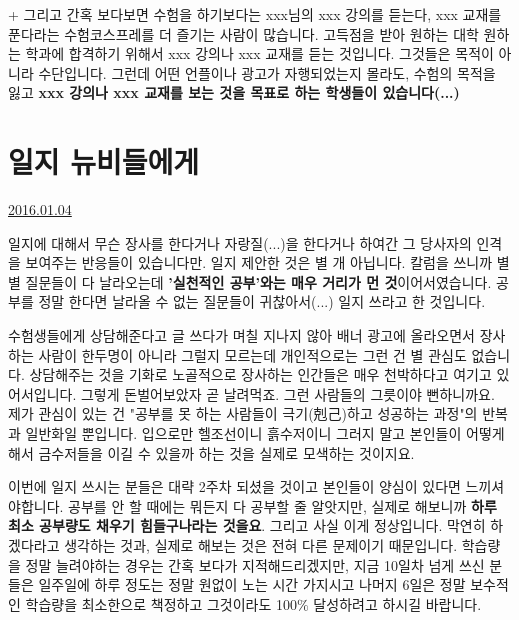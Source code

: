 + 그리고 간혹 보다보면 수험을 하기보다는 xxx님의 xxx 강의를 듣는다, xxx 교재를 푼다라는 수험코스프레를 더 즐기는 사람이 많습니다.
고득점을 받아 원하는 대학 원하는 학과에 합격하기 위해서 xxx 강의나 xxx 교재를 듣는 것입니다. 그것들은 목적이 아니라 수단입니다.
그런데 어떤 언플이나 광고가 자행되었는지 몰라도, 수험의 목적을 잃고 \textbf{xxx 강의나 xxx 교재를 보는 것을 목표로 하는 학생들이 있습니다(...)}
\vspace{5mm}






\section{일지 뉴비들에게}
\href{https://www.kockoc.com/Apoc/575186}{2016.01.04}

\vspace{5mm}

일지에 대해서 무슨 장사를 한다거나 자랑질(...)을 한다거나 하여간 그 당사자의 인격을 보여주는 반응들이 있습니다만.
일지 제안한 것은 별 개 아닙니다.
칼럼을 쓰니까 별별 질문들이 다 날라오는데 \textbf{'실천적인 공부'와는 매우 거리가 먼 것}이어서였습니다.
공부를 정말 한다면 날라올 수 없는 질문들이 귀찮아서(...) 일지 쓰라고 한 것입니다.
\vspace{5mm}

수험생들에게 상담해준다고 글 쓰다가 며칠 지나지 않아
배너 광고에 올라오면서 장사하는 사람이 한두명이 아니라 그럴지 모르는데
개인적으로는 그런 건 별 관심도 없습니다.
상담해주는 것을 기화로 노골적으로 장사하는 인간들은 매우 천박하다고 여기고 있어서입니다.
그렇게 돈벌어보았자 곧 날려먹죠. 그런 사람들의 그릇이야 뻔하니까요.
제가 관심이 있는 건 "공부를 못 하는 사람들이 극기(剋己)하고 성공하는 과정"의 반복과 일반화일 뿐입니다.
입으로만 헬조선이니 흙수저이니 그러지 말고 본인들이 어떻게 해서 금수저들을 이길 수 있을까 하는 것을 실제로 모색하는 것이지요.
\vspace{5mm}

이번에 일지 쓰시는 분들은 대략 2주차 되셨을 것이고 본인들이 양심이 있다면 느끼셔야합니다.
공부를 안 할 때에는 뭐든지 다 공부할 줄 알앗지만, 실제로 해보니까 \textbf{하루 최소 공부량도 채우기 힘들구나라는 것을요}.
그리고 사실 이게 정상입니다. 막연히 하겠다라고 생각하는 것과, 실제로 해보는 것은 전혀 다른 문제이기 때문입니다.
학습량을 정말 늘려야하는 경우는 간혹 보다가 지적해드리겠지만,
지금 10일차 넘게 쓰신 분들은 일주일에 하루 정도는 정말 원없이 노는 시간 가지시고
나머지 6일은 정말 보수적인 학습량을 최소한으로 책정하고 그것이라도 100$\%$ 달성하려고 하시길 바랍니다.
\vspace{5mm}

